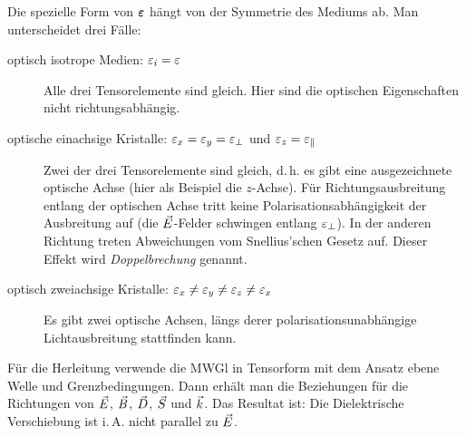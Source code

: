 Die spezielle Form von $\boldsymbol{\varepsilon}$ hängt von der Symmetrie des Mediums ab.
Man unterscheidet drei Fälle:
\begin{description}
\item[optisch isotrope Medien:  
  $\varepsilon_i = \varepsilon$] 
  Alle drei Tensorelemente sind
  gleich. Hier sind die optischen Eigenschaften nicht
  richtungsabhängig.
\item[optische einachsige Kristalle: 
  $\varepsilon_x=\varepsilon_y=\varepsilon_\bot$ und $\varepsilon_z=\varepsilon_\parallel$]
  Zwei der drei Tensorelemente sind gleich, d.\,h. es gibt eine ausgezeichnete
  optische Achse (hier als Beispiel die $z$-Achse). Für
  Richtungsausbreitung entlang der optischen Achse tritt keine
  Polarisationsabhängigkeit der Ausbreitung auf (die $\vec{E}$-Felder
  schwingen entlang $\varepsilon_\bot$). In der anderen Richtung treten
  Abweichungen vom Snellius'schen Gesetz auf.
  Dieser Effekt wird \emph{Doppelbrechung}
  genannt.
\item[optisch zweiachsige Kristalle:
  $\varepsilon_x\neq\varepsilon_y\neq\varepsilon_z\neq\varepsilon_x$]
  Es gibt zwei optische Achsen, längs derer polarisationsunabhängige
  Lichtausbreitung stattfinden kann.
\end{description}
Für die Herleitung verwende die MWGl in Tensorform mit dem Ansatz
ebene Welle und Grenzbedingungen.
Dann erhält man die Beziehungen für die Richtungen von $\vec{E}$,
$\vec{B}$, $\vec{D}$, $\vec{S}$ und $\vec{k}$.
Das Resultat ist:
Die Dielektrische Verschiebung ist i.\,A. nicht parallel zu $\vec{E}$.

